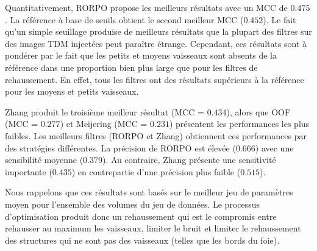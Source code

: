 Quantitativement, RORPO propose les meilleurs résultats avec un MCC de $0.475$. La référence à base de seuils obtient le second meilleur MCC ($0.452$). Le fait qu'un simple seuillage produise de meilleurs résultats que la plupart des filtres sur des images TDM injectées peut paraître étrange. Cependant, ces résultats sont à pondérer par le fait que les petits et moyens vaisseaux sont absents de la référence dans une proportion bien plus large que pour les filtres de rehaussement. En effet, tous les filtres ont des résultats supérieurs à la référence pour les moyens et petits vaisseaux.  

Zhang produit le troisième meilleur résultat (MCC = $0.434$), alors que OOF (MCC = $0.277$) et Meijering (MCC = $0.231$) présentent les performances les plus faibles. Les meilleurs filtres (RORPO et Zhang) obtiennent ces performances par des stratégies différentes. La précision de RORPO est élevée ($0.666$) avec une sensibilité moyenne ($0.379$). Au contraire, Zhang présente une sensitivité importante ($0.435$) en contrepartie d'une précision plus faible ($0.515$).

Nous rappelons que ces résultats sont basés sur le meilleur jeu de paramètres moyen pour l'ensemble des volumes du jeu de données. Le processus d'optimisation produit donc un rehaussement qui est le compromis entre rehausser au maximum les vaisseaux, limiter le bruit et limiter le rehaussement des structures qui ne sont pas des vaisseaux (telles que les bords du foie). 

